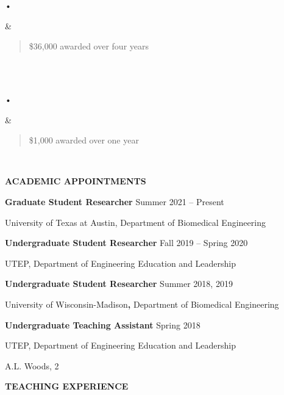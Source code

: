 \documentclass[
]{article}
\begin{document}
\begin{longtable}[]
\begin{minipage}[b]{\linewidth}\raggedleft
•
\end{minipage} & \begin{minipage}[b]{\linewidth}\raggedright
\begin{quote}
\$36,000 awarded over four years
\end{quote}
\end{minipage} \\
 \\
\begin{minipage}[b]{\linewidth}\raggedleft
•
\end{minipage} & \begin{minipage}[b]{\linewidth}\raggedright
\begin{quote}
\$1,000 awarded over one year
\end{quote}
\end{minipage} \\
\midrule\noalign{}
\endhead
\bottomrule\noalign{}
\endlastfoot
\end{longtable}

\textbf{ACADEMIC APPOINTMENTS}

\textbf{Graduate Student Researcher} Summer 2021 -- Present

University of Texas at Austin, Department of Biomedical Engineering

\textbf{Undergraduate Student Researcher} Fall 2019 -- Spring 2020

UTEP, Department of Engineering Education and Leadership

\textbf{Undergraduate Student Researcher} Summer 2018, 2019

University of Wisconsin-Madison\textbf{,} Department of Biomedical
Engineering

\textbf{Undergraduate Teaching Assistant} Spring 2018

UTEP, Department of Engineering Education and Leadership

A.L. Woods, 2

\textbf{TEACHING EXPERIENCE}
\end{document}

